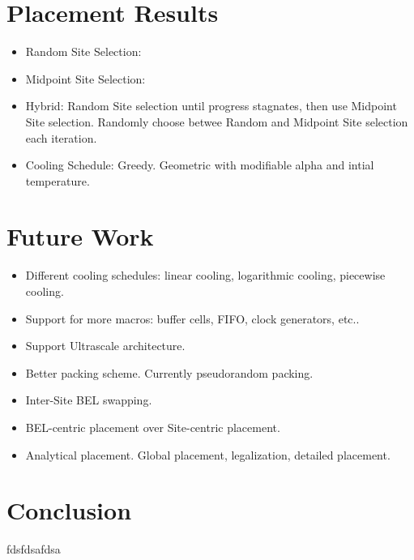 \documentclass{article}
\begin{document}
\begin{multicols}{2}
\section{Placement Results}
    \begin{itemize}
    \item Random Site Selection:
    \item Midpoint Site Selection:
    \item Hybrid: 
        Random Site selection until progress stagnates, then use Midpoint Site selection. 
        Randomly choose betwee Random and Midpoint Site selection each iteration. 
    \item Cooling Schedule: 
        Greedy. 
        Geometric with modifiable alpha and intial temperature. 
    \end{itemize}

\section{Future Work}
    \begin{itemize}
    \item Different cooling schedules: linear cooling, logarithmic cooling, piecewise cooling.
    \item Support for more macros: buffer cells, FIFO, clock generators, etc..
    \item Support Ultrascale architecture. 
    \item Better packing scheme. Currently pseudorandom packing. 
    \item Inter-Site BEL swapping. 
    \item BEL-centric placement over Site-centric placement.
    \item Analytical placement. Global placement, legalization, detailed placement. 
    \end{itemize}

\section{Conclusion}
    fdsfdsafdsa


\end{multicols}
\end{document}
